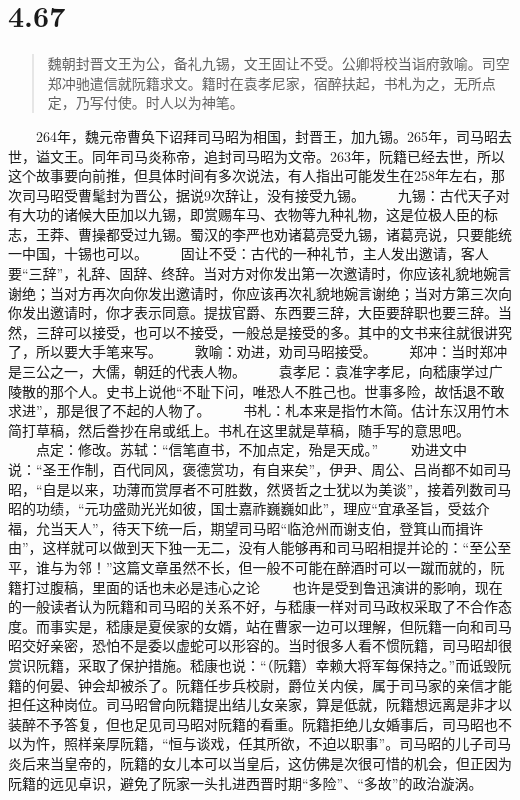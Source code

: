 \documentclass[]{book}
\begin{document}
\section{4.67}\label{section-244}

\begin{quote}
魏朝封晋文王为公，备礼九锡，文王固让不受。公卿将校当诣府敦喻。司空郑冲驰遣信就阮籍求文。籍时在袁孝尼家，宿醉扶起，书札为之，无所点定，乃写付使。时人以为神笔。
\end{quote}

　　264年，魏元帝曹奂下诏拜司马昭为相国，封晋王，加九锡。265年，司马昭去世，谥文王。同年司马炎称帝，追封司马昭为文帝。263年，阮籍已经去世，所以这个故事要向前推，但具体时间有多次说法，有人指出可能发生在258年左右，那次司马昭受曹髦封为晋公，据说9次辞让，没有接受九锡。
　　九锡：古代天子对有大功的诸候大臣加以九锡，即赏赐车马、衣物等九种礼物，这是位极人臣的标志，王莽、曹操都受过九锡。蜀汉的李严也劝诸葛亮受九锡，诸葛亮说，只要能统一中国，十锡也可以。
　　固让不受：古代的一种礼节，主人发出邀请，客人要``三辞''，礼辞、固辞、终辞。当对方对你发出第一次邀请时，你应该礼貌地婉言谢绝；当对方再次向你发出邀请时，你应该再次礼貌地婉言谢绝；当对方第三次向你发出邀请时，你才表示同意。提拔官爵、东西要三辞，大臣要辞职也要三辞。当然，三辞可以接受，也可以不接受，一般总是接受的多。其中的文书来往就很讲究了，所以要大手笔来写。
　　敦喻：劝进，劝司马昭接受。
　　郑冲：当时郑冲是三公之一，大儒，朝廷的代表人物。
　　袁孝尼：袁准字孝尼，向嵇康学过广陵散的那个人。史书上说他``不耻下问，唯恐人不胜己也。世事多险，故恬退不敢求进''，那是很了不起的人物了。
　　书札：札本来是指竹木简。估计东汉用竹木简打草稿，然后誊抄在帛或纸上。书札在这里就是草稿，随手写的意思吧。
　　点定：修改。苏轼：``信笔直书，不加点定，殆是天成。''
　　劝进文中说：``圣王作制，百代同风，褒德赏功，有自来矣''，伊尹、周公、吕尚都不如司马昭，``自是以来，功薄而赏厚者不可胜数，然贤哲之士犹以为美谈''，接着列数司马昭的功绩，``元功盛勋光光如彼，国士嘉祚巍巍如此''，理应``宜承圣旨，受兹介福，允当天人''，待天下统一后，期望司马昭``临沧州而谢支伯，登箕山而揖许由''，这样就可以做到天下独一无二，没有人能够再和司马昭相提并论的：``至公至平，谁与为邻！''这篇文章虽然不长，但一般不可能在醉酒时可以一蹴而就的，阮籍打过腹稿，里面的话也未必是违心之论
　　也许是受到鲁迅演讲的影响，现在的一般读者认为阮籍和司马昭的关系不好，与嵇康一样对司马政权采取了不合作态度。而事实是，嵇康是夏侯家的女婿，站在曹家一边可以理解，但阮籍一向和司马昭交好亲密，恐怕不是委以虚蛇可以形容的。当时很多人看不惯阮籍，司马昭却很赏识阮籍，采取了保护措施。嵇康也说：``（阮籍）幸赖大将军每保持之。''而诋毁阮籍的何晏、钟会却被杀了。阮籍任步兵校尉，爵位关内侯，属于司马家的亲信才能担任这种岗位。司马昭曾向阮籍提出结儿女亲家，算是低就，阮籍想远离是非才以装醉不予答复，但也足见司马昭对阮籍的看重。阮籍拒绝儿女婚事后，司马昭也不以为忤，照样亲厚阮籍，``恒与谈戏，任其所欲，不迫以职事''。司马昭的儿子司马炎后来当皇帝的，阮籍的女儿本可以当皇后，这仿佛是次很可惜的机会，但正因为阮籍的远见卓识，避免了阮家一头扎进西晋时期``多险''、``多故''的政治漩涡。
\end{document}

